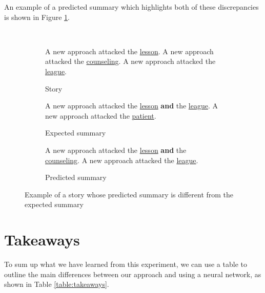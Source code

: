An example of a predicted summary which highlights both of these discrepancies is shown in Figure \ref{fig:discrepancy_example}.

\begin{figure}[H]\
\begin{subfigure}{\textwidth}
\begin{displayquote}
A new approach attacked the \underline{lesson}. A new approach attacked the \underline{counseling}. A new approach attacked the \underline{league}.
\end{displayquote}
\caption{Story}
\vspace{\baselineskip}
\end{subfigure}
\begin{subfigure}{\textwidth}
\begin{displayquote}
A new approach attacked the \underline{lesson} \textbf{and} the \underline{league}. A new approach attacked the \underline{patient}.
\end{displayquote}
\caption{Expected summary}
\vspace{\baselineskip}
\end{subfigure}
\begin{subfigure}{\textwidth}
\begin{displayquote}
A new approach attacked the \underline{lesson} \textbf{and} the \underline{counseling}. A new approach attacked the \underline{league}.
\end{displayquote}
\caption{Predicted summary}
\end{subfigure}
\caption{Example of a story whose predicted summary is different from the expected summary}
\label{fig:discrepancy_example}
\end{figure}

\section{Takeaways}

To sum up what we have learned from this experiment, we can use a table to outline the main differences between our approach and using a neural network, as shown in Table \ref{table:takeaways}.

